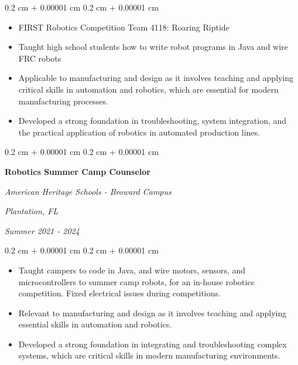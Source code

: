 \documentclass[10pt, letterpaper]{article}
\newenvironment{highlights}{
    \begin{itemize}[
        topsep=0.10 cm,
        parsep=0.10 cm,
        partopsep=0pt,
        itemsep=0pt,
        leftmargin=0.4 cm + 10pt
    ]
}{
    \end{itemize}
} %
\newenvironment{onecolentry}{
    \begin{adjustwidth}{
        0.2 cm + 0.00001 cm
    }{
        0.2 cm + 0.00001 cm
    }
}{
    \end{adjustwidth}
} %
\newenvironment{twocolentry}[2][]{
    \onecolentry
    \def\secondColumn{#2}
    \setcolumnwidth{\fill, 4.5 cm}
    \begin{paracol}{2}
}{
    \switchcolumn \raggedleft \secondColumn
    \end{paracol}
    \endonecolentry
} %
\begin{document}
        \vspace{0.10 cm}
        \begin{onecolentry}
            \begin{highlights}
                \item FIRST Robotics Competition Team 4118: Roaring Riptide 
                \item Taught high school students how to write robot programs in Java and wire FRC robots
                \item Applicable to manufacturing and design as it involves
                teaching and applying critical skills in automation and robotics, which are essential for
                modern manufacturing processes.
                \item Developed a strong foundation in troubleshooting, system integration, and the practical
                application of robotics in automated production lines.
            \end{highlights}
        \end{onecolentry}


        \vspace{0.2 cm}

        \begin{twocolentry}{
        \textit{Plantation, FL}    
            
        \textit{Summer 2021 - 2024}}
            \textbf{Robotics Summer Camp Counselor}
            
            \textit{American Heritage Schools - Broward Campus}
        \end{twocolentry}

        \vspace{0.10 cm}
        \begin{onecolentry}
            \begin{highlights}
                \item Taught campers to code in Java, and wire motors, sensors, and microcontrollers to summer camp robots, for an in-house robotics competition. Fixed electrical issues during competitions. 
                \item Relevant to manufacturing and design as it involves teaching and applying essential skills
                in automation and robotics. 
                \item Developed a strong foundation in integrating and troubleshooting complex systems, which are critical skills in modern manufacturing environments.
            \end{highlights}
        \end{onecolentry}
\end{document}
